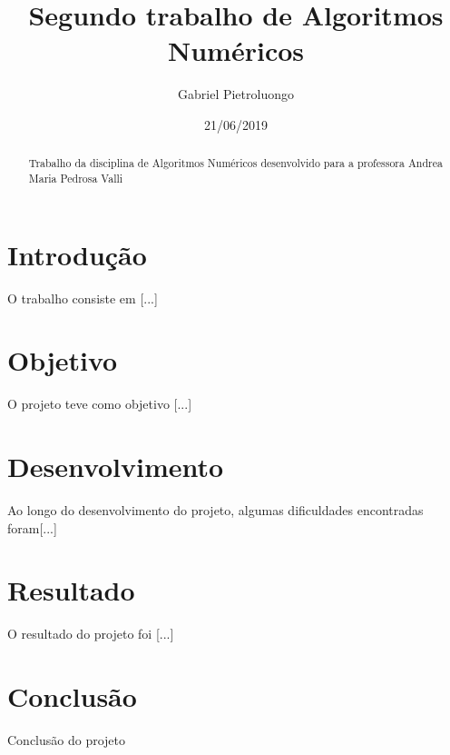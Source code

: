 \documentclass[a4paper, 12pt]{report}
\title{Segundo trabalho de Algoritmos Numéricos}
\author{Gabriel Pietroluongo}
\date {21/06/2019}
\begin{document}
\maketitle
\begin{abstract}
Trabalho da disciplina de Algoritmos Numéricos desenvolvido para a professora Andrea Maria Pedrosa Valli
\end{abstract}
\tableofcontents
\newpage
\chapter{Introdução}
O trabalho consiste em [...]
\chapter{Objetivo}
O projeto teve como objetivo [...]
\chapter{Desenvolvimento}
Ao longo do desenvolvimento do projeto, algumas dificuldades encontradas foram[...]
\chapter{Resultado}
O resultado do projeto foi [...]
\chapter{Conclusão}
Conclusão do projeto
\end{document}
